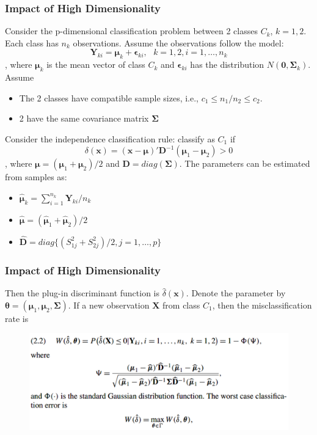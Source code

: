 \documentclass{beamer}
\begin{document}
	\begin{frame}
		\frametitle{Impact of High Dimensionality}
		Consider the p-dimensional classification problem between 2 classes $C_k$, $k=1,2$. Each class has $n_k$ observations. Assume the observations follow the model:
		$$\bm{Y}_{ki} = \bm{\mu}_k + \bm{\epsilon}_{ki}, \,\,\,\,k=1,2,i=1,\ldots,n_k$$
		, where $\bm{\mu}_k$ is the mean vector of class $C_k$ and $\bm{\epsilon}_{ki}$ has the distribution $N(\bm{0}, \bm{\Sigma}_k)$. Assume
		\begin{itemize}
			\item
			The 2 classes have compatible sample sizes, i.e., $c_1\leq n_1/n_2\leq c_2$.
			\item
			2 have the same covariance matrix $\bm{\Sigma}$
		\end{itemize}
		Consider the independence classification rule: classify as $C_1$ if
		$$\delta(\bm{x}) = (\bm{x} - \bm{\mu})'\bm{D}^{-1}(\bm{\mu}_1 - \bm{\mu}_2) > 0$$
		, where $\bm{\mu} = (\bm{\mu}_1 + \bm{\mu}_2)/2$ and $\bm{D} = diag(\bm{\Sigma})$. The parameters can be estimated from samples as:
		\begin{itemize}
			\item 
			$\hat{\bm{\mu}}_k = \sum_{i=1}^{n_k}\bm{Y}_{ki}/n_{k}$
			\item
			$\hat{\bm{\mu}} = (\hat{\bm{\mu}}_1 + \hat{\bm{\mu}}_2)/2$
			\item
			$\hat{\bm{D}} = diag\{(S_{1j}^2 + S_{2j}^2)/2, j=1,\ldots,p\}$
		\end{itemize}
	\end{frame}
	
	\begin{frame}
		\frametitle{Impact of High Dimensionality}
		Then the plug-in discriminant function is $\hat{\delta}(\bm{x})$. Denote the parameter by $\bm{\theta} = (\bm{\mu}_1, \bm{\mu}_2, \bm{\Sigma})$. If a new observation $\bm{X}$ from class $C_1$, then the misclassification rate is
		\begin{figure}
			\includegraphics[width=0.9\linewidth]{image001.png}
		\end{figure}
	\end{frame}
\end{document}
